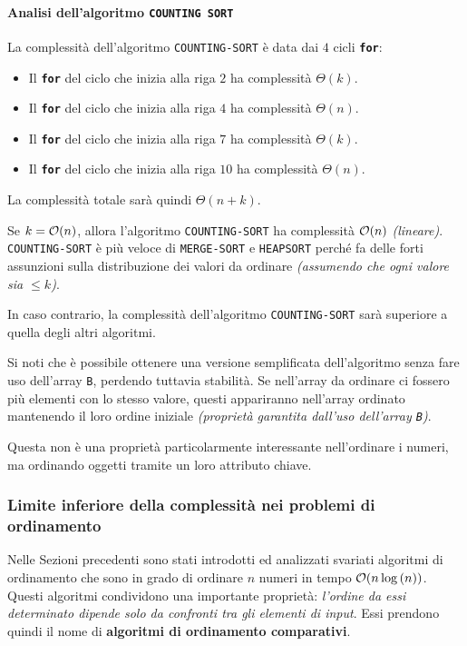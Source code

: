 \documentclass[italian, 10pt]{article}
\begin{document}
\paragraph{Analisi dell'algoritmo \texttt{COUNTING SORT}}

La complessità dell'algoritmo \texttt{COUNTING-SORT} è data dai \(4\) cicli \textbf{\texttt{for}}:

\begin{itemize}
  \item Il \textbf{\texttt{for}} del ciclo che inizia alla riga \(2\) ha complessità \(\Theta(k)\).
  \item Il \textbf{\texttt{for}} del ciclo che inizia alla riga \(4\) ha complessità \(\Theta(n)\).
  \item Il \textbf{\texttt{for}} del ciclo che inizia alla riga \(7\) ha complessità \(\Theta(k)\).
  \item Il \textbf{\texttt{for}} del ciclo che inizia alla riga \(10\) ha complessità \(\Theta(n)\).
\end{itemize}

La complessità totale sarà quindi \(\Theta(n+k)\).

Se \(k = \mathcal{O}(n)\), allora l'algoritmo \texttt{COUNTING-SORT} ha complessità \(\mathcal{O}(n)\) \textit{(lineare)}.
\texttt{COUNTING-SORT} è più veloce di \texttt{MERGE-SORT} e \texttt{HEAPSORT} perché fa delle forti assunzioni sulla distribuzione dei valori da ordinare \textit{(assumendo che ogni valore sia \(\leq k\))}.

In caso contrario, la complessità dell'algoritmo \texttt{COUNTING-SORT} sarà superiore a quella degli altri algoritmi.

\bigskip
Si noti che è possibile ottenere una versione semplificata dell'algoritmo senza fare uso dell'array \texttt{B}, perdendo tuttavia stabilità.
Se nell'array da ordinare ci fossero più elementi con lo stesso valore, questi appariranno nell'array ordinato mantenendo il loro ordine iniziale \textit{(proprietà garantita dall'uso dell'array \texttt{B})}.

Questa non è una proprietà particolarmente interessante nell'ordinare i numeri, ma ordinando oggetti tramite un loro attributo chiave.

\subsubsection{Limite inferiore della complessità nei problemi di ordinamento}

Nelle Sezioni precedenti sono stati introdotti ed analizzati svariati algoritmi di ordinamento che sono in grado di ordinare \(n\) numeri in tempo \(\mathcal{O}(n \log{(n)})\).
Questi algoritmi condividono una importante proprietà: \textit{l'ordine da essi determinato dipende solo da confronti tra gli elementi di input}.
Essi prendono quindi il nome di \textbf{algoritmi di ordinamento comparativi}.
\end{document}

